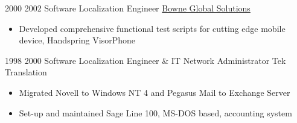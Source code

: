\documentclass[a4paper]{twentysecondcv} %
\begin{document}
\begin{twenty}
\twentyitem
	{2000}
	{2002}
    {Software Localization Engineer}
    {\href{https://www.lionbridge.com/}{Bowne Global Solutions}}
    {}
    {}
    {\begin{itemize}
		\item Developed comprehensive functional test scripts for cutting edge mobile device, Handspring VisorPhone
	 \end{itemize}
    }
\end{twenty}

\begin{twenty}
\twentyitem
	{1998}
	{2000}
    {Software Localization Engineer \& IT Network Administrator}
    {Tek Translation}
    {}
    {}
    {\begin{itemize}
		\item Migrated Novell to Windows NT 4 and Pegasus Mail to Exchange Server
		\item Set-up and maintained Sage Line 100, MS-DOS based, accounting system
	 \end{itemize}
    }
\end{twenty}
\end{document}
